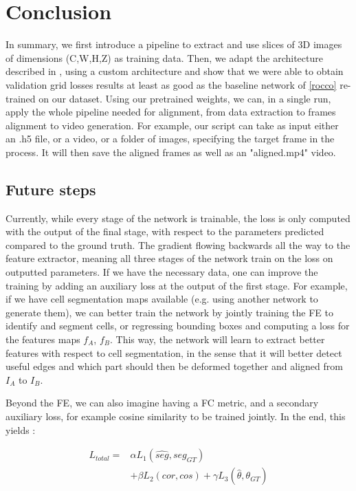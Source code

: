 \documentclass[10pt,conference,compsocconf]{IEEEtran}
\begin{document}
\section{\textbf{Conclusion}}
In summary, we first introduce a pipeline to extract and use slices of 3D images of dimensions (C,W,H,Z) as training data. Then, we adapt the architecture described in \cite{roccoConvolutionalNeuralNetwork2017}, using a custom architecture and show that we were able to obtain validation grid losses results at least as good as the baseline network of \ref{rocco} re-trained on our dataset. Using our pretrained weights, we can, in a single run, apply the whole pipeline needed for alignment, from data extraction to frames alignment to video generation. For example, our script can take as input either an .h5 file, or a video, or a folder of images, specifying the target frame in the process. It will then save the aligned frames as well as an "aligned.mp4" video.


\subsection{Future steps}
Currently, while every stage of the network is trainable, the loss is only computed with the output of the final stage, with respect to the parameters predicted compared to the ground truth. The gradient flowing backwards all the way to the feature extractor, meaning all three stages of the network train on the loss on outputted parameters. If we have the necessary data, one can improve the training by adding an auxiliary loss at the output of the first stage. For example, if we have cell segmentation maps available (e.g. using another network\cite{dietler_yeaz_2020} to generate them), we can better train the network by jointly training the FE to identify and segment cells, or regressing bounding boxes and computing a loss for the features maps $f_{A}$, $f_{B}$. This way, the network will learn to extract better features with respect to cell segmentation, in the sense that it will better detect useful edges and which part should then be deformed together and aligned from $I_{A}$ to $I_{B}$. 

Beyond the FE, we can also imagine having a FC metric, and a secondary auxiliary loss, for example cosine similarity to be trained jointly. In the end, this yields : 

\vspace{-0.13cm}
\begin{equation}
    \begin{split}
    L_{total} =& \alpha L_{1}(\hat{seg}, seg_{GT})\\
       &+ \beta L_{2}(cor,cos)+\gamma L_{3}(\hat{\theta}, \theta_{GT})
    \end{split}
\end{equation}
\end{document}
